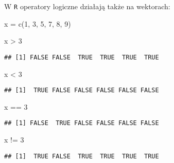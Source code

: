 \documentclass[
]{article}
\newenvironment{Shaded}{\begin{snugshade}}{\end{snugshade}}
\newcommand{\DecValTok}[1]{\textcolor[rgb]{0.00,0.00,0.81}{#1}}
\newcommand{\FunctionTok}[1]{\textcolor[rgb]{0.00,0.00,0.00}{#1}}
\newcommand{\NormalTok}[1]{#1}
\newcommand{\OtherTok}[1]{\textcolor[rgb]{0.56,0.35,0.01}{#1}}
\newcommand{\SpecialCharTok}[1]{\textcolor[rgb]{0.00,0.00,0.00}{#1}}
\begin{document}
W \texttt{R} operatory logiczne działają także na wektorach:

\begin{Shaded}
\begin{Highlighting}[]
\NormalTok{x }\OtherTok{=} \FunctionTok{c}\NormalTok{(}\DecValTok{1}\NormalTok{, }\DecValTok{3}\NormalTok{, }\DecValTok{5}\NormalTok{, }\DecValTok{7}\NormalTok{, }\DecValTok{8}\NormalTok{, }\DecValTok{9}\NormalTok{)}
\end{Highlighting}
\end{Shaded}

\begin{Shaded}
\begin{Highlighting}[]
\NormalTok{x }\SpecialCharTok{\textgreater{}} \DecValTok{3}
\end{Highlighting}
\end{Shaded}

\begin{verbatim}
## [1] FALSE FALSE  TRUE  TRUE  TRUE  TRUE
\end{verbatim}

\begin{Shaded}
\begin{Highlighting}[]
\NormalTok{x }\SpecialCharTok{\textless{}} \DecValTok{3}
\end{Highlighting}
\end{Shaded}

\begin{verbatim}
## [1]  TRUE FALSE FALSE FALSE FALSE FALSE
\end{verbatim}

\begin{Shaded}
\begin{Highlighting}[]
\NormalTok{x }\SpecialCharTok{==} \DecValTok{3}
\end{Highlighting}
\end{Shaded}

\begin{verbatim}
## [1] FALSE  TRUE FALSE FALSE FALSE FALSE
\end{verbatim}

\begin{Shaded}
\begin{Highlighting}[]
\NormalTok{x }\SpecialCharTok{!=} \DecValTok{3}
\end{Highlighting}
\end{Shaded}

\begin{verbatim}
## [1]  TRUE FALSE  TRUE  TRUE  TRUE  TRUE
\end{verbatim}
\end{document}
